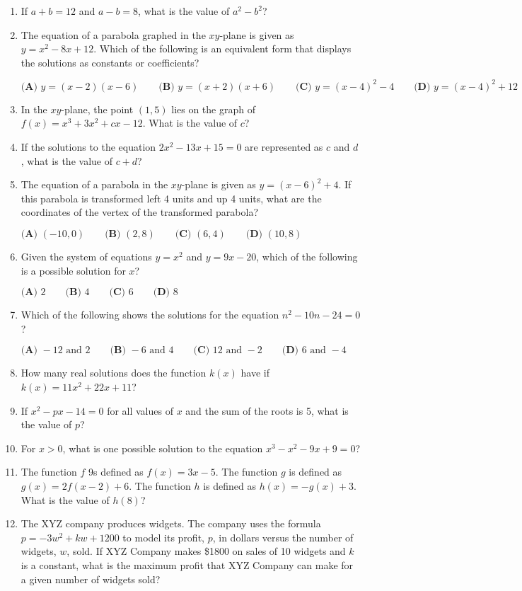 \documentclass[../satmath.tex]{subfiles}
\begin{document}
\begin{enumerate}[label=\bfseries\arabic*.]
\item If $a+b=12$ and $a-b=8$, what is the value of $a^2-b^2$?
 
\item The equation of a parabola graphed in the $xy$-plane is given as $y=x^2-8x+12$. Which of the following is an equivalent form that displays the 
solutions as constants or coefficients?

$\textbf{(A) } y=(x-2)(x-6) \qquad \textbf{(B) } y=(x+2)(x+6) \qquad \textbf{(C) } y=(x-4)^2-4 \qquad \textbf{(D) } y=(x-4)^2+12$
 
\item In the $xy$-plane, the point $(1,5)$ lies on the graph of $f(x)=x^3+3x^2+cx-12$. What is the value of $c$?

\item If the solutions to the equation $2x^2-13x+15=0$ are represented as $c$ and $d$, what is the value of $c+d$?

\item The equation of a parabola in the $xy$-plane is given as $y=(x-6)^2+4$. If this parabola is transformed left 4 units and up 4 units, what are the coordinates of the vertex of the transformed parabola?

$\textbf{(A) } (-10, 0) \qquad \textbf{(B) } (2, 8) \qquad \textbf{(C) } (6, 4) \qquad \textbf{(D) } (10, 8)$

\item Given the system of equations $y=x^2$ and $y=9x-20$, which of the following is a possible solution for $x$?

$\textbf{(A) } 2 \qquad \textbf{(B) } 4 \qquad \textbf{(C) } 6 \qquad \textbf{(D) } 8$

\item Which of the following shows the solutions for the equation $n^2-10n-24=0$?

$\textbf{(A) } -12 \text{ and } 2 \qquad \textbf{(B) } -6 \text{ and } 4 \qquad \textbf{(C) } 12 \text{ and } -2 \qquad \textbf{(D) } 6 \text{ and } -4$

\item How many real solutions does the function $k(x)$ have if $k(x)=11x^2+22x+11$?

\item If $x^2-px-14=0$ for all values of $x$ and the sum of the roots is 5, what is the value of $p$?
 
\item For $x>0$, what is one possible solution to the equation $x^3-x^2-9x+9=0$?
 
\item The function $f$ 9s defined as $f(x)=3x-5$. The function $g$ is defined as $g(x)=2f(x-2)+6$. The function $h$ is defined as $h(x)=-g(x)+3$. What is the value of $h(8)$?
 
\item The XYZ company produces widgets. The company uses the formula $p=-3w^2+kw+1200$ to model its profit, $p$, in dollars versus the number of widgets, $w$, sold. 
If XYZ Company makes \$1800 on sales of 10 widgets and $k$ is a constant, what is the maximum profit that XYZ Company can make for a given number of widgets sold? 

\end{enumerate}
\end{document}
